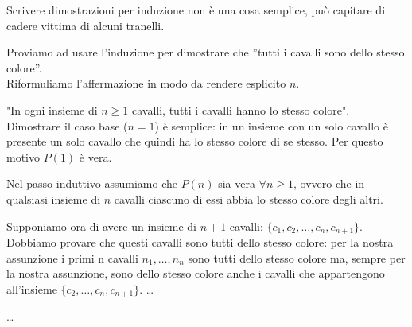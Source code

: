 Scrivere dimostrazioni per induzione non è una cosa semplice, può capitare di cadere vittima di alcuni tranelli. 
\begin{ese}
	Proviamo ad usare l'induzione per
	dimostrare che ''tutti i cavalli sono dello stesso colore''.\\
	Riformuliamo l'affermazione in modo da rendere esplicito $n$.
	
	"In ogni insieme di $n \geq 1$ cavalli, tutti i cavalli hanno lo stesso colore". Dimostrare il caso base ($n = 1$) è semplice: in un insieme con un solo
	cavallo è presente un solo cavallo che quindi ha lo stesso colore di se stesso. Per questo motivo $P(1)$ è vera.
	
	Nel passo induttivo assumiamo che $P(n)$ sia vera $\forall n \geq 1$, ovvero che in qualsiasi insieme di $n$ cavalli ciascuno di essi abbia lo stesso colore degli altri.
	
	Supponiamo ora di avere un insieme di $n+1$ cavalli: $\{c_1, c_2, \dots, c_n, c_{n+1}\}$. Dobbiamo provare che questi cavalli sono tutti dello stesso colore: per la 
	nostra assunzione i primi n cavalli $n_1, \dots, n_n$ sono tutti dello stesso colore ma, sempre
	per la nostra assunzione, sono dello stesso colore anche i cavalli che appartengono all'insieme 
	$\{c_2, \dots, c_n, c_{n+1}\}$. \dots
	\QEDA
\end{ese}

\begin{defn}
	\dots
\end{defn}
